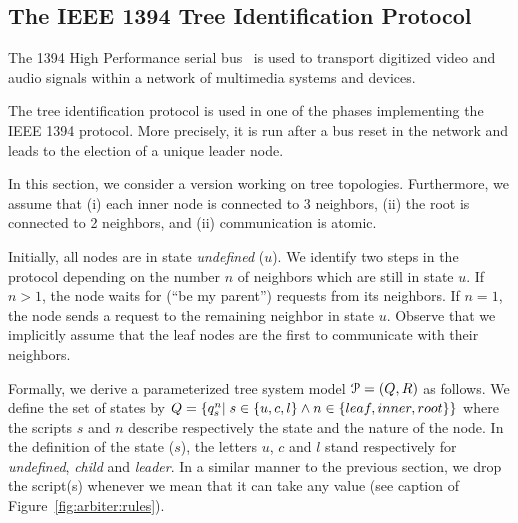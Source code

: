 %
\subsection{The IEEE 1394 Tree Identification Protocol}
%

The 1394 High Performance serial bus~\cite{ieee:1394} is used to transport digitized video and
audio signals within a network of multimedia systems and devices. 
% 

The tree identification protocol is used in one of the phases implementing the IEEE 1394 protocol.
%
More precisely, it is run after a bus reset in the network and leads to the election of a unique 
leader node.
%

In this section, we consider a version working on tree topologies.
%
Furthermore, we assume that (i) each inner node is connected to 3 neighbors, (ii) the root is connected 
to 2 neighbors, and (ii) communication is atomic.
%

Initially, all nodes are in state \emph{undefined} ($u$). 
%
We identify two steps in the protocol depending on the number $n$ of neighbors which are 
still in state $u$.
%
If $n>1$, the node waits for (``be my parent'') requests from its neighbors. 
%
If $n=1$, the node sends a request to the remaining neighbor in state $u$. 
%
Observe that we implicitly assume that the leaf nodes are the first to communicate with their neighbors.
%

Formally, we derive a parameterized tree system model ${\EuScript P}=\left(Q,R\right)$ as follows.
%
We define the set of states by $Q=\left\{q_s^n|\;s\in\left\{u,c,l\right\}\wedge n\in\left\{leaf,inner,root\right\}\right\}$ 
where the scripts $s$ and $n$ describe respectively the state and the nature of the node.
%
In the definition of the state ($s$), the letters $u$, $c$ and $l$ stand respectively for \emph{undefined}, 
\emph{child} and \emph{leader}.
%
In a similar manner to the previous section, we drop the script(s) whenever we mean that it can take any value 
(see caption of Figure~\ref{fig:arbiter:rules}).
% 

